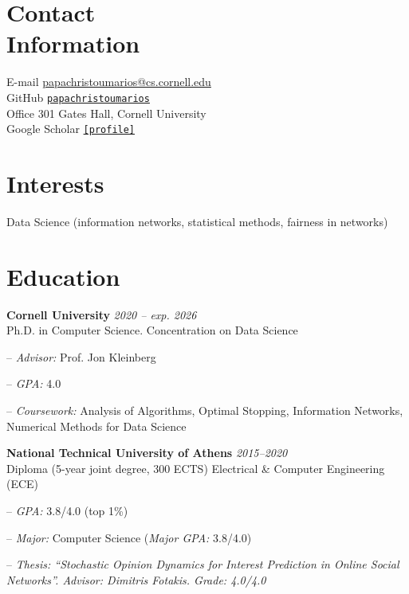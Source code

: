 \documentclass[margin, 10pt]{res}
\newcommand{\field}[2]{\noindent \textbf{#1} \hfill #2 \\}
\newcommand{\specialurl}[2]{\href { #2 } {\nolinkurl{[#1]}}}
\begin{document}
\begin{resume}

\section{Contact \\ Information} 
E-mail \hfill \url{papachristoumarios@cs.cornell.edu} \\
GitHub \hfill \href{http://github.com/papachristoumarios}{\nolinkurl{papachristoumarios}} \\
Office \hfill 301 Gates Hall, Cornell University \\
Google Scholar \hfill \specialurl{profile}{https://scholar.google.gr/citations?user=T12JO3MAAAAJ&hl=en}


\section{Interests} Data Science (information networks, statistical methods, fairness in networks)

\section{Education}
\field {Cornell University} {\emph{2020 -- exp. 2026}}
Ph.D. in Computer Science. Concentration on Data Science
\begin{compactitem}
\item[--] \emph{Advisor:} Prof. Jon Kleinberg
\item[--] \emph{GPA:} 4.0
\item[--] \emph{Coursework:} Analysis of Algorithms, Optimal Stopping, Information Networks, Numerical Methods for Data Science
\end{compactitem} 
 
\field{National Technical University of Athens}  {\emph{2015--2020}} 
Diploma (5-year joint degree, 300 ECTS) Electrical \& Computer Engineering (ECE)
\begin{compactitem}
\item[--] \emph{GPA:} 3.8/4.0 (top 1\%)
\item[--] \emph{Major:} Computer Science (\emph{Major GPA:} 3.8/4.0)
\item[--] \emph{Thesis: ``Stochastic Opinion Dynamics for Interest Prediction in Online Social Networks''. Advisor: Dimitris Fotakis. Grade: 4.0/4.0}
\end{compactitem} 



\end{resume}
\end{document}

